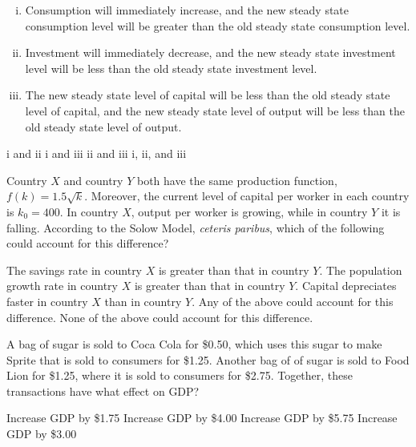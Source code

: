 \documentclass[addpoints,11pt]{exam}
\theoremstyle{definition}
\begin{document}
\begin{questions}
	\begin{enumerate}[i.]
		\item Consumption will immediately increase, and the new steady state consumption level will be greater than the old steady state consumption level.
		\item Investment will immediately decrease, and the new steady state investment level will be less than the old steady state investment level.
		\item The new steady state level of capital will be less than the old steady state level of capital, and the new steady state level of output will be less than the old steady state level of output.
	\end{enumerate}
	
\begin{choices}
	\choice i and ii
	\choice i and iii
	\CorrectChoice ii and iii
	\choice i, ii, and iii
\end{choices}


\question Country $X$ and country $Y$ both have the same production function, $f(k)=1.5\sqrt{k}$. Moreover, the current level of capital per worker in each country is $k_0 = 400$. In country $X$, output per worker is growing, while in country $Y$ it is falling. According to the Solow Model, \textit{ceteris paribus}, which of the following could account for this difference?
	
	\begin{choices}
		\CorrectChoice The savings rate in country $X$ is greater than that in country $Y$.
		\choice The population growth rate in country $X$ is greater than that in country $Y$.
		\choice Capital depreciates faster in country $X$ than in country $Y$.
		\choice Any of the above could account for this difference.
		\choice None of the above could account for this difference.
	\end{choices}
	
\newpage

\question A bag of sugar is sold to Coca Cola for \$0.50, which uses this sugar to make Sprite that is sold to consumers for \$1.25. Another bag of of sugar is sold to Food Lion for \$1.25, where it is sold to consumers for \$2.75. Together, these transactions have what effect on GDP?


\begin{choices}
		\choice Increase GDP by \$1.75
		\CorrectChoice Increase GDP by \$4.00
		\choice Increase GDP by \$5.75
		\choice Increase GDP by \$3.00
\end{choices}


\end{questions}
\end{document}
